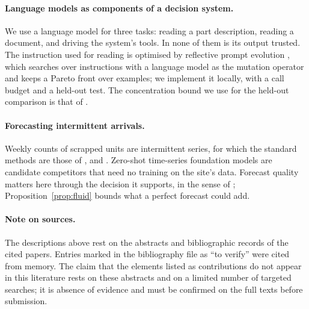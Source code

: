 \paragraph{Language models as components of a decision system.} We use a language model for three tasks: reading a
part description, reading a document, and driving the system's tools. In none of them is its output trusted. The
instruction used for reading is optimised by reflective prompt evolution \citep{agrawal2025gepa}, which searches
over instructions with a language model as the mutation operator and keeps a Pareto front over examples; we
implement it locally, with a call budget and a held-out test. The concentration bound we use for the held-out
comparison is that of \citet{hoeffding1963}.

\paragraph{Forecasting intermittent arrivals.} Weekly counts of scrapped units are intermittent series, for which
the standard methods are those of \citet{croston1972}, \citet{syntetos2005} and \citet{teunter2011}. Zero-shot
time-series foundation models \citep{ansari2024chronos,das2024timesfm,woo2024,cohen2024toto,cohen2025time,mistral2026timestral}
are candidate competitors that need no training on the site's data. Forecast quality matters here through the
decision it supports, in the sense of \citet{elmachtoub2022}; Proposition~\ref{prop:fluid} bounds what a perfect
forecast could add.

\paragraph{Note on sources.} The descriptions above rest on the abstracts and bibliographic records of the cited
papers. Entries marked in the bibliography file as ``to verify'' were cited from memory. The claim that the
elements listed as contributions do not appear in this literature rests on these abstracts and on a limited number
of targeted searches; it is absence of evidence and must be confirmed on the full texts before submission.
